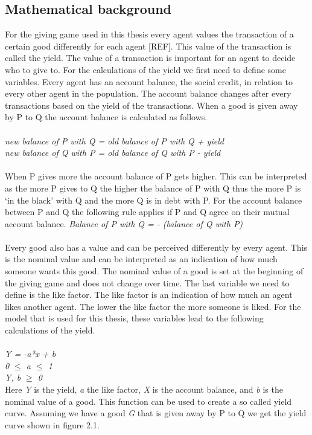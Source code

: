 \documentclass[twoside,openright]{uva-bachelor-thesis}
\begin{document}
\subsection{Mathematical background}
For the giving game used in this thesis every agent values the transaction of a certain good differently for each agent [REF]. This value of the transaction is called the yield. The value of a transaction is important for an agent to decide who to give to. For the calculations of the yield we first need to define some variables. Every agent has an account balance, the social credit, in relation to every other agent in the population. The account balance changes after every transactions based on the yield of the transactions. When a good is given away by P to Q the account balance is calculated as follows.\\
\\
\textit{new balance of P with Q = old balance of P with Q + yield} \\
\textit{new balance of Q with P = old balance of Q with P - yield} \\
\\
When P gives more the account balance of P gets higher. This can be interpreted as the more P gives to Q the higher the balance of P with Q thus the more P is ‘in the black’ with Q and the more Q is in debt with P. 
For the account balance between P and Q the following rule applies if P and Q agree on their mutual account balance.
\textit{Balance of P with Q = - (balance of Q with P)}
\\
\\
Every good also has a value and can be perceived differently by every agent. This is the nominal value and can be interpreted as an indication of how much someone wants this good. The nominal value of a good is set at the beginning of the giving game and does not change over time. The last variable we need to define is the like factor. The like factor is an indication of how much an agent likes another agent. The lower the like factor the more someone is liked.
For the model that is used for this thesis, these variables lead to the following calculations of the yield.
\\
\\
\textit{Y = -a*x + b} \\
\textit{0 $\le$ a $\le$ 1} \\
\textit{Y, b $\ge$ 0} \\
Here \textit{Y} is the yield, \textit{a} the like factor, \textit{X} is the account balance, and \textit{b} is the nominal value of a good. This function can be used to create a so called yield curve. Assuming we have a good \textit{G} that is given away by P to Q we get the yield curve shown in figure 2.1.
\end{document}
